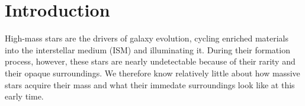 \documentclass{emulateapj}
\begin{document}
\ifpdf
\maketitle
\fi

%

\section{Introduction}
High-mass stars are the drivers of galaxy evolution, cycling enriched materials
into the interstellar medium (ISM) and illuminating it.  During their formation
process, however, these stars are nearly undetectable because of their rarity
and their opaque surroundings.  We therefore know relatively little about how
massive stars acquire their mass and what their immedate surroundings look like
at this early time.
\end{document}
